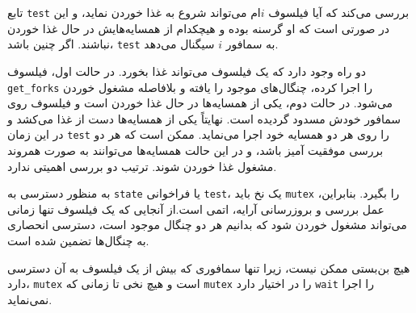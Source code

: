 \documentclass{book}
\begin{document}

    تابع {\tt test}  بررسی می‌کند که آیا فیلسوف $i$ام می‌تواند شروع به غذا خوردن نماید، و این در صورتی است که 
    او گرسنه بوده و هیچکدام از همسایه‌هایش در حال غذا خوردن نباشند. اگر چنین باشد، {\tt test} به سمافور $i$ سیگنال می‌دهد. 
    
    دو راه وجود دارد که یک فیلسوف می‌تواند غذا بخورد. در حالت اول، فیلسوف {\tt get\_forks} را اجرا کرده، چنگال‌های موجود را یافته و 
    بلافاصله مشغول خوردن می‌شود. در حالت دوم، یکی از همسایه‌ها در حال غذا خوردن است و فیلسوف روی سمافور خودش مسدود گردیده است. 
    نهایتاً یکی از همسایه‌ها دست از غذا می‌کشد و در این زمان  {\tt test} را روی هر دو همسایه خود اجرا می‌نماید. 
    ممکن است که هر دو بررسی موفقیت آمیز باشد، و در این حالت همسایه‌ها می‌توانند به صورت همروند مشغول غذا خوردن شوند. 
    ترتیب دو بررسی اهمیتی ندارد. 

    به منظور دسترسی به {\tt state} یا فراخوانی {\tt test}، یک نخ باید {\tt mutex} را بگیرد. 
    بنابراین، عمل بررسی و بروزرسانی آرایه، اتمی است.از آنجایی که یک فیلسوف تنها زمانی می‌تواند مشغول خوردن شود که بدانیم هر دو چنگال موجود است، 
    دسترسی انحصاری به چنگال‌ها تضمین شده است. 

    هیچ بن‌بستی ممکن نیست، زیرا تنها سمافوری که بیش از یک فیلسوف به آن دسترسی دارد، {\tt mutex} است و هیچ نخی  
    تا زمانی که {\tt mutex} را در اختیار دارد {\tt wait} را اجرا نمی‌نماید. 
\end{document}
